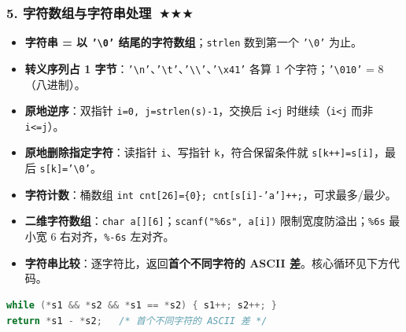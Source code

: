 \documentclass[UTF8,zihao=-4,a4paper]{ctexart}
\newcommand{\cstar}{\textcolor{deepred}{$\bigstar$}}
\begin{document}
\subsubsection*{5. 字符数组与字符串处理\ \cstar\cstar\cstar}
\begin{itemize}
  \item \textbf{字符串 = 以 \texttt{'\textbackslash 0'} 结尾的字符数组}；\texttt{strlen} 数到第一个 \texttt{'\textbackslash 0'} 为止。
  \item \textbf{转义序列占 1 字节}：\texttt{'\textbackslash n'}、\texttt{'\textbackslash t'}、\texttt{'\textbackslash\textbackslash'}、\texttt{'\textbackslash x41'} 各算 1 个字符；\texttt{'\textbackslash 010'} = 8（八进制）。
  \item \textbf{原地逆序}：双指针 \texttt{i=0,\ j=strlen(s)-1}，交换后 \texttt{i<j} 时继续（\texttt{i<j} 而非 \texttt{i<=j}）。
  \item \textbf{原地删除指定字符}：读指针 \texttt{i}、写指针 \texttt{k}，符合保留条件就 \texttt{s[k++]=s[i]}，最后 \texttt{s[k]='\textbackslash 0'}。
  \item \textbf{字符计数}：桶数组 \texttt{int cnt[26]=\{0\}; cnt[s[i]-'a']++;}，可求最多/最少。
  \item \textbf{二维字符数组}：\texttt{char a[][6]}；\texttt{scanf("\%6s", a[i])} 限制宽度防溢出；\texttt{\%6s} 最小宽 6 右对齐，\texttt{\%-6s} 左对齐。
  \item \textbf{字符串比较}：逐字符比，返回\textbf{首个不同字符的 ASCII 差}。核心循环见下方代码。
\end{itemize}
\begin{lstlisting}[language=C]
while (*s1 && *s2 && *s1 == *s2) { s1++; s2++; }
return *s1 - *s2;   /* 首个不同字符的 ASCII 差 */
\end{lstlisting}
\end{document}
